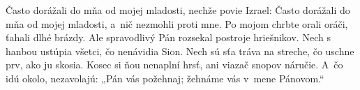 Často dorážali do mňa od mojej mladosti,
nechže povie Izrael:
\versseparator
Často dorážali do mňa od mojej mladosti,
a~nič nezmohli proti mne.
\versseparator
Po mojom chrbte orali oráči,
ťahali dlhé brázdy.
\versseparator
Ale spravodlivý Pán
rozsekal postroje hriešnikov.
Nech s hanbou ustúpia
všetci, čo nenávidia Sion.
\versseparator
Nech sú sťa tráva na streche,
čo uschne prv, ako ju skosia.
\versseparator
Kosec si ňou nenaplní hrsť,
ani viazač snopov náručie.
\versseparator
A~čo idú okolo, nezavolajú:
„Pán vás požehnaj;
žehnáme vás v~mene Pánovom.“